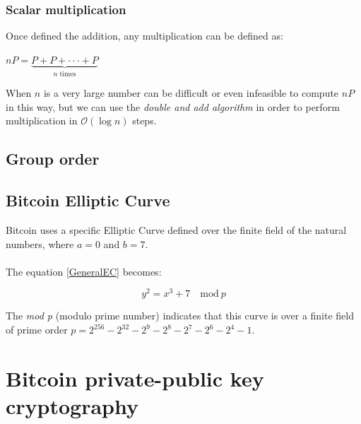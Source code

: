\subsubsection{Scalar multiplication}
Once defined the addition, any multiplication can be defined as:
\begin{center} 
	$ nP=\underbrace{
		P+P+\cdot \cdot \cdot+P
	}_{n\text{ times}}$
\end{center}
When $n$ is a very large number can be difficult or even infeasible to compute $nP$ in this way, but we can use the \textit{double and add algorithm} in order to perform multiplication in $\mathcal{O}(\log{}n)$ steps.

\subsection{Group order}

\subsection{Bitcoin Elliptic Curve}
Bitcoin uses a specific Elliptic Curve defined over the finite field of the natural numbers, where $a=0$ and $b=7$. \\ \\
The equation \ref{GeneralEC} becomes:

\begin{equation}\label{BitcoinEC}
y^2=x^3+7 \quad \textrm{mod} \ p
\end{equation}

The \textit{mod p} (modulo prime number) indicates that this curve is over a finite field of prime order $p=2^{256}-2^{32}-2^9-2^8-2^7-2^6-2^4-1$.

\section{Bitcoin private-public key cryptography}




